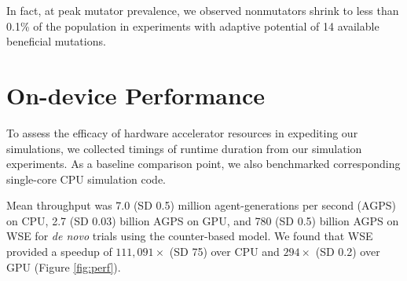 % 
In fact, at peak mutator prevalence, we observed nonmutators shrink to less than 0.1\% of the population in experiments with adaptive potential of 14 available beneficial mutations.

\section{On-device Performance}
\label{sec:performance}



To assess the efficacy of hardware accelerator resources in expediting our simulations, we collected timings of runtime duration from our simulation experiments.
As a baseline comparison point, we also benchmarked corresponding single-core CPU simulation code.

Mean throughput was 7.0 (SD 0.5) million agent-generations per second (AGPS) on CPU, 2.7 (SD 0.03) billion AGPS on GPU, and 780 (SD 0.5) billion AGPS on WSE for \textit{de novo} trials using the counter-based model.
We found that WSE provided a speedup of $111,091\times$ (SD 75) over CPU and $294\times$ (SD 0.2) over GPU (Figure \ref{fig:perf}).

